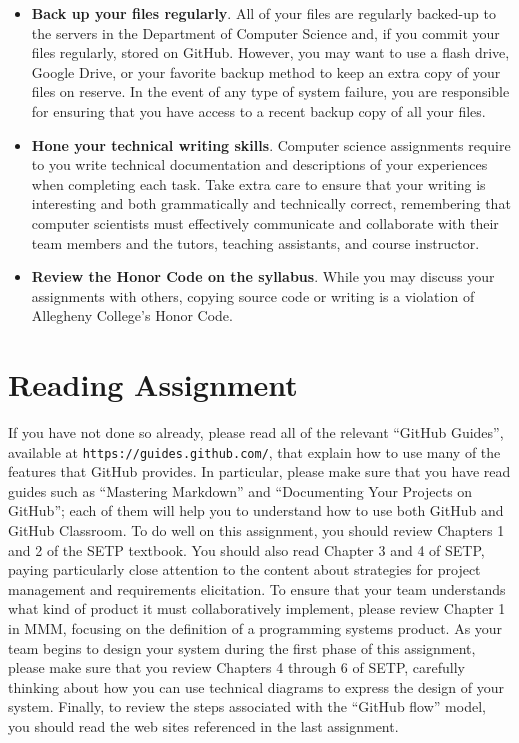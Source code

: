 \documentclass[11pt]{article}
\newcommand{\url}[1]{\lstinline{#1}}
\begin{document}
\begin{itemize}
\item {\bf Back up your files regularly}. All of your files are regularly backed-up to the servers in the Department of
  Computer Science and, if you commit your files regularly, stored on GitHub. However, you may want to use a flash
  drive, Google Drive, or your favorite backup method to keep an extra copy of your files on reserve. In the event of
  any type of system failure, you are responsible for ensuring that you have access to a recent backup copy of all your
  files.

\item {\bf Hone your technical writing skills}. Computer science assignments require to you write technical
  documentation and descriptions of your experiences when completing each task. Take extra care to ensure that your
  writing is interesting and both grammatically and technically correct, remembering that computer scientists must
  effectively communicate and collaborate with their team members and the tutors, teaching assistants, and course
  instructor.

\item {\bf Review the Honor Code on the syllabus}. While you may discuss your assignments with others, copying source
  code or writing is a violation of Allegheny College's Honor Code.

\end{itemize}

\vspace*{-1em}

\section*{Reading Assignment}

If you have not done so already, please read all of the relevant ``GitHub Guides'', available at
\url{https://guides.github.com/}, that explain how to use many of the features that GitHub provides. In particular,
please make sure that you have read guides such as ``Mastering Markdown'' and ``Documenting Your Projects on GitHub'';
each of them will help you to understand how to use both GitHub and GitHub Classroom. To do well on this assignment, you
should review Chapters 1 and 2 of the SETP textbook. You should also read Chapter 3 and 4 of SETP, paying particularly
close attention to the content about strategies for project management and requirements elicitation. To ensure that your
team understands what kind of product it must collaboratively implement, please review Chapter 1 in MMM, focusing on the
definition of a programming systems product. As your team begins to design your system during the first phase of this
assignment, please make sure that you review Chapters 4 through 6 of SETP, carefully thinking about how you can use
technical diagrams to express the design of your system. Finally, to review the steps associated with the ``GitHub
flow'' model, you should read the web sites referenced in the last assignment.
\end{document}
